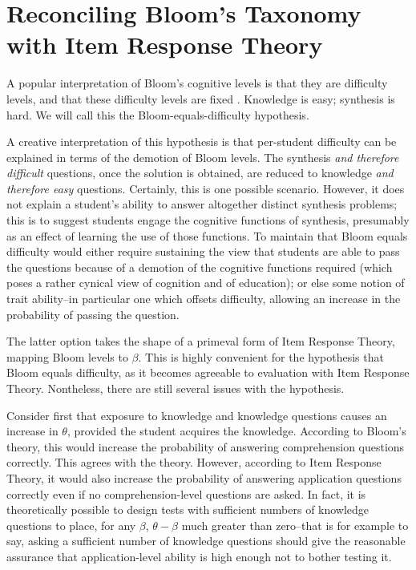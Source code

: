 
\section{Reconciling Bloom's Taxonomy with Item Response Theory}

A popular interpretation of Bloom's cognitive levels is that they are
difficulty levels, and that these difficulty levels are fixed
\cite{newman1988effect,oliver2004course,lord2007moving,
johnson2006bloom,fuller2007developing}.  Knowledge is easy; synthesis is hard.
We will call this the Bloom-equals-difficulty hypothesis.

A creative interpretation of this hypothesis is that per-student difficulty can
be explained in terms of the demotion of Bloom levels.  The synthesis \emph{and
therefore difficult} questions, once the solution is obtained, are reduced to
knowledge \emph{and therefore easy} questions.  Certainly, this is one possible
scenario.  However, it does not explain a student's ability to answer
altogether distinct synthesis problems; this is to suggest students engage the
cognitive functions of synthesis, presumably as an effect of learning the use
of those functions.  To maintain that Bloom equals difficulty would either
require sustaining the view that students are able to pass the questions
because of a demotion of the cognitive functions required (which poses a rather
cynical view of cognition and of education); or else some notion of trait
ability--in particular one which offsets difficulty, allowing an increase in
the probability of passing the question.

The latter option takes the shape of a primeval form of Item Response Theory,
mapping Bloom levels to $\beta$.  This is highly convenient for the hypothesis
that Bloom equals difficulty, as it becomes agreeable to evaluation with Item
Response Theory.  Nontheless, there are still several issues with the
hypothesis.

Consider first that exposure to knowledge and knowledge questions causes an
increase in $\theta$, provided the student acquires the knowledge.  According
to Bloom's theory, this would increase the probability of answering
comprehension questions correctly.  This agrees with the theory.  However,
according to Item Response Theory, it would also increase the probability of
answering application questions correctly even if no comprehension-level
questions are asked.  In fact, it is theoretically possible to design tests
with sufficient numbers of knowledge questions to place, for any $\beta$,
$\theta-\beta$ much greater than zero--that is for example to say, asking a
sufficient number of knowledge questions should give the reasonable assurance
that application-level ability is high enough not to bother testing it.

